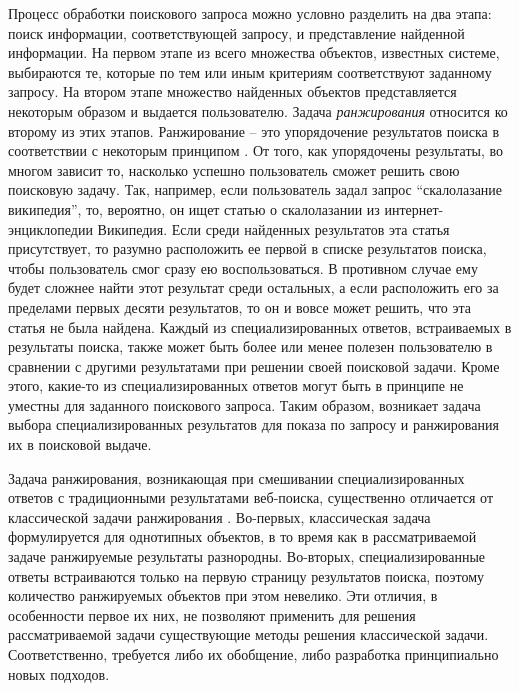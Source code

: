 \documentclass[12pt,a4paper]{report}
\begin{document}
Процесс обработки поискового запроса можно условно разделить на два этапа: поиск информации, соответствующей запросу, и представление найденной информации.
На первом этапе из всего множества объектов, известных системе, выбираются те, которые по тем или иным критериям соответствуют заданному запросу. На втором этапе множество найденных объектов представляется некоторым образом и выдается пользователю. 
Задача \emph{ранжирования} относится ко второму из этих этапов. Ранжирование -- это упорядочение результатов поиска в соответствии с некоторым принципом \cite{Ashmanov, Liu-LR}. От того, как упорядочены результаты, во многом зависит то, насколько успешно пользователь сможет решить свою поисковую задачу. 
Так, например, если пользователь задал запрос ``скалолазание википедия'', то, вероятно, он ищет статью о скалолазании из интернет-энциклопедии Википедия. Если среди найденных результатов эта статья присутствует, то разумно расположить ее первой в списке результатов поиска, чтобы пользователь смог сразу ею воспользоваться. В противном случае ему будет сложнее найти этот результат среди остальных, а если расположить его за пределами первых десяти результатов, то он и вовсе может решить, что эта статья не была найдена. Каждый из специализированных ответов, встраиваемых в результаты поиска, также может быть более или менее полезен пользователю в сравнении с другими результатами при решении своей поисковой задачи. 
Кроме этого, какие-то из специализированных ответов могут быть в принципе не уместны для заданного поискового запроса. Таким образом, возникает задача выбора специализированных результатов для показа по запросу и ранжирования их в поисковой выдаче. 

Задача ранжирования, возникающая при смешивании специализированных ответов с традиционными результатами веб-поиска, существенно отличается от классической задачи ранжирования \cite{Liu-LR}. 
Во-первых, классическая задача формулируется для однотипных объектов, в то время как в рассматриваемой задаче ранжируемые результаты разнородны.
Во-вторых, специализированные ответы встраиваются только на первую страницу результатов поиска, поэтому количество ранжируемых объектов при этом невелико. Эти отличия, в особенности первое их них, не позволяют применить для решения рассматриваемой задачи существующие методы решения классической задачи. Соответственно, требуется либо их обобщение, либо разработка принципиально новых подходов.
\end{document}
